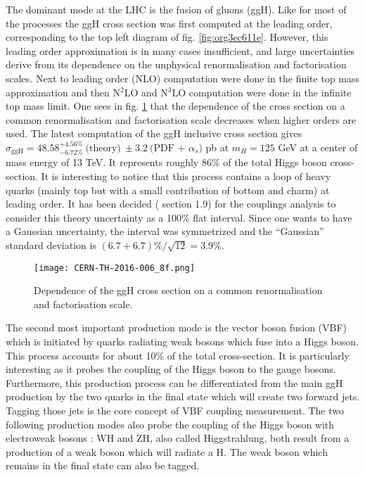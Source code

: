 \begin{enumerate}
The dominant mode at the LHC is the fusion of gluons (ggH).
Like for most of the processes the ggH cross section was first computed at the leading order, corresponding to the top left diagram of fig. \ref{fig:org3ec611e}.
However, this leading order approximation is in many cases insufficient, and large uncertainties derive from its dependence on the unphysical renormalisation and factorisation scales.
Next to leading order (NLO) computation were done in the finite top mass approximation \cite{Spira:1995rr} and then N$^2$LO and N$^3$LO computation were done \cite{CERN-PH-TH-2015-055,CERN-TH-2016-006} in the infinite top mass limit.
One sees in fig. \ref{CERN-TH-2016-006_8f} that the dependence of the cross section on a common renormalisation and factorisation scale decreases when higher orders are used.
The latest computation of the ggH inclusive cross section gives $\sigma_{\text{ggH}} = 48.58 ^{+4.56\%}_{-6.72\%}\ \text{(theory)}\ \pm 3.2\ \text{(PDF + }\alpha_s\text{)}$ pb at $m_H=125$ GeV at a center of mass energy of 13 TeV.
It represents roughly 86\% of the total Higgs boson cross-section.
It is interesting to notice that this process contains a loop of heavy quarks (mainly top but with a small contribution of bottom and charm) at leading order.
It has been decided (\cite{deFlorian:2227475} section 1.9) for the couplings analysis to consider this theory uncertainty as a 100\% flat interval.
Since one wants to have a Gaussian uncertainty, the interval was symmetrized and the ``Gaussian'' standard deviation is $(6.7+6.7)\% /\sqrt{12} = 3.9\%$.

\begin{figure}[h!]
  \centering
  \texttt{[image: CERN-TH-2016-006\_8f.png]}
  \caption{Dependence of the ggH cross section on a common renormalisation and factorisation scale. \cite{CERN-TH-2016-006}}
  \label{CERN-TH-2016-006_8f}
\end{figure}

The second most important production mode is the vector boson fusion (VBF) which is initiated by quarks radiating weak bosons which fuse into a Higgs boson.
This process accounts for about 10\% of the total cross-section.
It is particularly interesting as it probes the coupling of the Higgs boson to the gauge bosons.
Furthermore, this production process can be differentiated from the main ggH production by the two quarks in the final state which will create two forward jets.
Tagging those jets is the core concept of VBF coupling measurement.
The two following production modes also probe the coupling of the Higgs boson with electroweak bosons : WH and ZH, also called Higgstrahlung, both result from a production of a weak boson which will radiate a H.
The weak boson which remains in the final state can also be tagged.


\end{enumerate}
